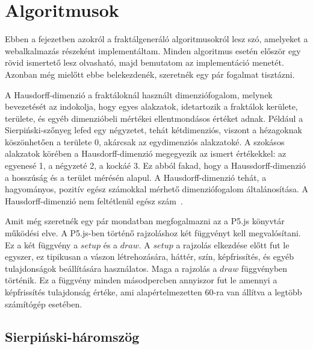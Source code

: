\chapter{Algoritmusok}

Ebben a fejezetben azokról a fraktálgeneráló algoritmusokról lesz szó, amelyeket a webalkalmazás részeként implementáltam. Minden algoritmus esetén először egy rövid ismertető lesz olvasható, majd bemutatom az implementáció menetét. Azonban még mielőtt ebbe belekezdenék, szeretnék egy pár fogalmat tisztázni.
\par A Hausdorff-dimenzió a fraktáloknál használt dimenziófogalom, melynek bevezetését az indokolja, hogy egyes alakzatok, idetartozik a fraktálok kerülete, területe, és egyéb dimenzióbeli mértékei ellentmondásos értéket adnak. Például a Sierpiński-szőnyeg lefed egy négyzetet, tehát kétdimenziós, viszont a hézagoknak köszönhetően a területe 0, akárcsak az egydimenziós alakzatoké. A szokásos alakzatok körében a Hausdorff-dimenzió megegyezik az ismert értékekkel: az egyenesé 1, a négyzeté 2, a kockáé 3. Ez abból fakad, hogy a Haussdorff-dimenzió a hosszúság és a terület mérésén alapul. A Hausdorff-dimenzió tehát, a hagyományos, pozitív egész számokkal mérhető dimenziófogalom általánosítása. A Hausdorff-dimenzió nem feltétlenül egész szám~\cite{hausdorff}.
\par Amit még szeretnék egy pár mondatban megfogalmazni az a P5.js könyvtár működési elve. A P5.js-ben történő rajzoláshoz két függvényt kell megvalósítani. Ez a két függvény a $setup$ és a $draw$. A $setup$ a rajzolás elkezdése előtt fut le egyszer, ez tipikusan a vászon létrehozására, háttér, szín, képfrissítés, és egyéb tulajdonságok beállítására használatos. Maga a rajzolás a $draw$ függvényben történik. Ez a függvény minden másodpercben annyiszor fut le amennyi a képfrissítés tulajdonság értéke, ami alapértelmezetten 60-ra van állítva a legtöbb számítógép esetében.


\section{Sierpiński-háromszög}

